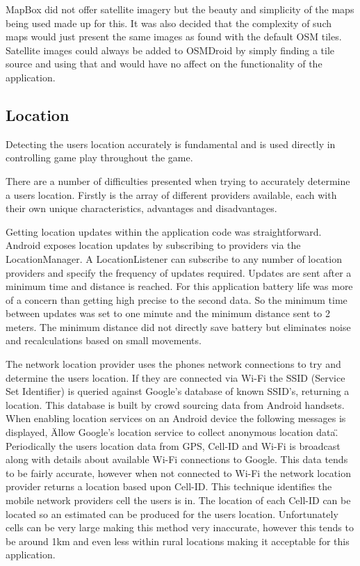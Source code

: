 MapBox did not offer satellite imagery but the beauty and simplicity of the maps being used made up for this. It was also decided that the complexity of such maps would just present the same images as found with the default OSM tiles. Satellite images could always be added to OSMDroid by simply finding a tile source and using that and would have no affect on the functionality of the application. 


\subsection{Location}
Detecting the users location accurately is fundamental and is used directly in controlling game play throughout the game.

There are a number of difficulties presented when trying to accurately determine a users location. Firstly is the array of different providers available, each with their own unique characteristics, advantages and disadvantages.

Getting location updates within the application code was straightforward. Android exposes location updates by subscribing to providers via the LocationManager. A LocationListener can subscribe to any number of location providers and specify the frequency of updates required. Updates are sent after a minimum time and distance is reached. For this application battery life was more of a concern than getting high precise to the second data. So the minimum time between updates was set to one minute and the minimum distance sent to 2 meters. The minimum distance did not directly save battery but eliminates noise and recalculations based on small movements.

The network location provider uses the phones network connections to try and determine the users location. If they are connected via Wi-Fi the SSID (Service Set Identifier) is queried against Google's database of known SSID's, returning a location. This database is built by crowd sourcing data from Android handsets. When enabling location services on an Android device the following messages is displayed, \"Allow Google's location service to collect anonymous location data\". Periodically the users location data from GPS, Cell-ID and Wi-Fi is broadcast along with details about available Wi-Fi connections to Google. This data tends to be fairly accurate, however when not connected to Wi-Fi the network location provider returns a location based upon Cell-ID. This technique identifies the mobile network providers cell the users is in. The location of each Cell-ID can be located so an estimated can be produced for the users location. Unfortunately cells can be very large making this method very inaccurate, however this tends to be around 1km and even less within rural locations\cite{1377314} making it acceptable for this application.

